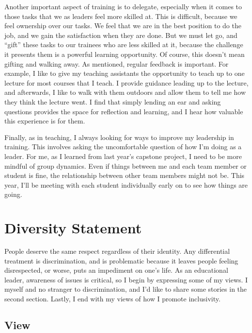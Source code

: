 \documentclass[]{article}
\begin{document}
Another important aspect of training is to delegate, especially when it comes to those tasks that we as leaders feel more skilled at. This is difficult, because we feel ownership over our tasks. We feel that we are in the best position to do the job, and we gain the satisfaction when they are done. But we must let go, and ``gift'' these tasks to our trainees who are less skilled at it, because the challenge it presents them is a powerful learning opportunity. Of course, this doesn't mean gifting and walking away. As mentioned, regular feedback is important. For example, I like to give my teaching assistants the opportunity to teach up to one lecture for most courses that I teach. I provide guidance leading up to the lecture, and afterwards, I like to walk with them outdoors and allow them to tell me how they think the lecture went. I find that simply lending an ear and asking questions provides the space for reflection and learning, and I hear how valuable this experience is for them.

Finally, as in teaching, I always looking for ways to improve my leadership in training. This involves asking the uncomfortable question of how I'm doing as a leader. For me, as I learned from last year's capstone project, I need to be more mindful of group dynamics. Even if things between me and each team member or student is fine, the relationship between other team members might not be. This year, I'll be meeting with each student individually early on to see how things are going.

\hypertarget{diversity-statement}{%
\section{Diversity Statement}\label{diversity-statement}}

People deserve the same respect regardless of their identity. Any differential treatment is discrimination, and is problematic because it leaves people feeling disrespected, or worse, puts an impediment on one's life. As an educational leader, awareness of issues is critical, so I begin by expressing some of my views. I myself and no stranger to discrimination, and I'd like to share some stories in the second section. Lastly, I end with my views of how I promote inclusivity.

\hypertarget{view}{%
\subsection{View}\label{view}}
\end{document}
